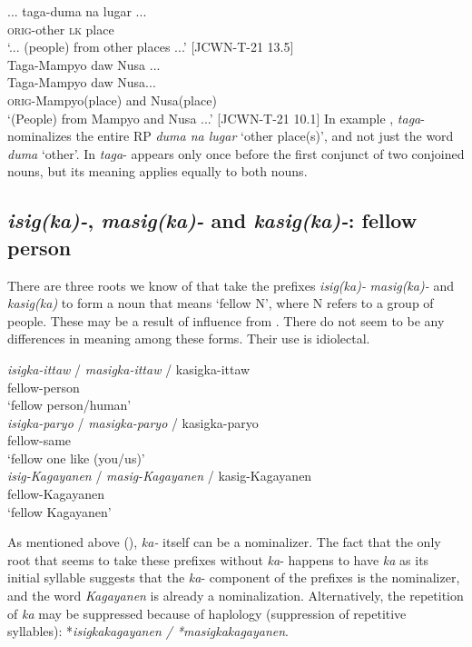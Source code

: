     \gll ... taga-duma na lugar ... \\
     { } \textsc{orig}-other \textsc{lk} place \\
    \glt `... (people) from other places ...' [JCWN-T-21 13.5] \\
    \ex 
    \label{ex:andnusa}
    Taga-Mampyo  daw  Nusa ... \\
    \gll Taga-Mampyo  daw  Nusa{}... \\
    \textsc{orig}-Mampyo(place) and Nusa(place) \\
    \glt `(People) from Mampyo and Nusa ...' [JCWN-T-21 10.1]
    \z
\z
In example , \textit{taga}- nominalizes the entire RP \textit{duma na lugar} `other place(s)', and not just the word \textit{duma} `other'. In  \textit{taga}- appears only once before the first conjunct of two conjoined nouns, but its meaning applies equally to both nouns. 

\subsection{\textit{isig(ka)-}, \textit{masig(ka)-} and \textit{kasig(ka)-}: fellow person}
\label{sec:isig}

There are three roots we know of that take the prefixes \textit{isig(ka)-} \textit{masig(ka)-} and \textit{kasig(ka)} to form a noun that means ‘fellow N’, where N refers to a group of people. These may be a result of influence from . There do not seem to be any differences in meaning among these forms. Their use is  idiolectal. 

\ea
\label{bkm:Ref106967184} \label{ex:isigka}
    \ea 
    \label{ex:isigka-a}
    \gll \textit{isigka-ittaw} / \textit{masigka-ittaw} / kasigka-ittaw \\
        fellow-person \\
    \glt ‘fellow person/human’ \\
    \ex 
    \label{ex:isigka-b}
    \gll \textit{isigka-paryo} / \textit{masigka-paryo} / kasigka-paryo \\
    fellow-same \\
    \glt ‘fellow one like (you/us)’ \\
    \ex
    \label{ex:isigka-c}
    \gll \textit{isig-Kagayanen} / \textit{masig-Kagayanen} / kasig-Kagayanen \\
    fellow-Kagayanen \\
    \glt ‘fellow Kagayanen’
    \z
\z

As mentioned above (), \textit{ka-} itself can be a nominalizer. The fact that the only root that seems to take these prefixes without \textit{ka}{}- happens to have \textit{ka} as its initial syllable  suggests that the \textit{ka}- component of the prefixes is the nominalizer, and the word \textit{Kagayanen} is already a nominalization. Alternatively, the repetition of \textit{ka} may be suppressed because of haplology (suppression of repetitive syllables): *\textit{isigkakagayanen / *masigkakagayanen}. 

